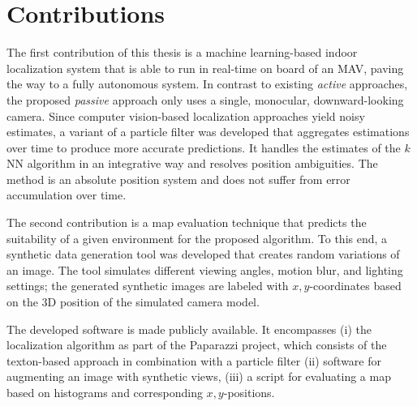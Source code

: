 \section{Contributions}
\label{sec:contributions}

The first contribution of this thesis is a machine learning-based
indoor localization system that is able to run in real-time on board
of an MAV, paving the way to a fully autonomous system. In contrast to
existing \emph{active} approaches, the proposed \emph{passive}
approach only uses a single, monocular, downward-looking camera. Since
computer vision-based localization approaches yield noisy estimates, a
variant of a particle filter was developed that aggregates estimations
over time to produce more accurate predictions. It handles the
estimates of the $k$NN algorithm in an integrative way and resolves
position ambiguities. The method is an absolute position system and does not suffer from error
accumulation over time.

The second contribution is a map evaluation technique that predicts
the suitability of a given environment for the proposed algorithm. To
this end, a synthetic data generation tool was developed that creates
random variations of an image. The tool simulates different viewing
angles, motion blur, and lighting settings; the generated synthetic
images are labeled with $x,y$-coordinates based on the 3D position of
the simulated camera model.

The developed software is made publicly available. It encompasses (i)
the localization algorithm as part of the Paparazzi project, which
consists of the texton-based approach in combination with a particle
filter (ii) software for augmenting an image with synthetic views,
(iii) a script for evaluating a map based on histograms and
corresponding $x,y$-positions.

